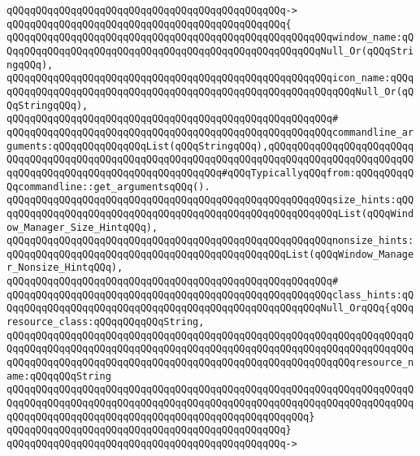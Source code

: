 \verb|qQQqqQQqqQQqqQQqqQQqqQQqqQQqqQQqqQQqqQQqqQQqqQQq->|\newline
\verb|qQQqqQQqqQQqqQQqqQQqqQQqqQQqqQQqqQQqqQQqqQQqqQQq{|\newline
\verb|qQQqqQQqqQQqqQQqqQQqqQQqqQQqqQQqqQQqqQQqqQQqqQQqqQQqqQQqwindow_name:qQQqqQQqqQQqqQQqqQQqqQQqqQQqqQQqqQQqqQQqqQQqqQQqqQQqqQQqNull_Or(qQQqStringqQQq),|\newline
\verb|qQQqqQQqqQQqqQQqqQQqqQQqqQQqqQQqqQQqqQQqqQQqqQQqqQQqqQQqicon_name:qQQqqQQqqQQqqQQqqQQqqQQqqQQqqQQqqQQqqQQqqQQqqQQqqQQqqQQqqQQqqQQqNull_Or(qQQqStringqQQq),|\newline
\verb|qQQqqQQqqQQqqQQqqQQqqQQqqQQqqQQqqQQqqQQqqQQqqQQqqQQqqQQq#|\newline
\verb|qQQqqQQqqQQqqQQqqQQqqQQqqQQqqQQqqQQqqQQqqQQqqQQqqQQqqQQqcommandline_arguments:qQQqqQQqqQQqqQQqList(qQQqStringqQQq),qQQqqQQqqQQqqQQqqQQqqQQqqQQqqQQqqQQqqQQqqQQqqQQqqQQqqQQqqQQqqQQqqQQqqQQqqQQqqQQqqQQqqQQqqQQqqQQqqQQqqQQqqQQqqQQqqQQqqQQqqQQqqQQqqQQq#qQQqTypicallyqQQqfrom:qQQqqQQqqQQqcommandline::get_argumentsqQQq().|\newline
\verb|qQQqqQQqqQQqqQQqqQQqqQQqqQQqqQQqqQQqqQQqqQQqqQQqqQQqqQQqsize_hints:qQQqqQQqqQQqqQQqqQQqqQQqqQQqqQQqqQQqqQQqqQQqqQQqqQQqqQQqqQQqList(qQQqWindow_Manager_Size_HintqQQq),|\newline
\verb|qQQqqQQqqQQqqQQqqQQqqQQqqQQqqQQqqQQqqQQqqQQqqQQqqQQqqQQqnonsize_hints:qQQqqQQqqQQqqQQqqQQqqQQqqQQqqQQqqQQqqQQqqQQqqQQqList(qQQqWindow_Manager_Nonsize_HintqQQq),|\newline
\verb|qQQqqQQqqQQqqQQqqQQqqQQqqQQqqQQqqQQqqQQqqQQqqQQqqQQqqQQq#|\newline
\verb|qQQqqQQqqQQqqQQqqQQqqQQqqQQqqQQqqQQqqQQqqQQqqQQqqQQqqQQqclass_hints:qQQqqQQqqQQqqQQqqQQqqQQqqQQqqQQqqQQqqQQqqQQqqQQqqQQqqQQqNull_OrqQQq{qQQqresource_class:qQQqqQQqqQQqString,|\newline
\verb|qQQqqQQqqQQqqQQqqQQqqQQqqQQqqQQqqQQqqQQqqQQqqQQqqQQqqQQqqQQqqQQqqQQqqQQqqQQqqQQqqQQqqQQqqQQqqQQqqQQqqQQqqQQqqQQqqQQqqQQqqQQqqQQqqQQqqQQqqQQqqQQqqQQqqQQqqQQqqQQqqQQqqQQqqQQqqQQqqQQqqQQqqQQqqQQqqQQqqQQqresource_name:qQQqqQQqString|\newline
\verb|qQQqqQQqqQQqqQQqqQQqqQQqqQQqqQQqqQQqqQQqqQQqqQQqqQQqqQQqqQQqqQQqqQQqqQQqqQQqqQQqqQQqqQQqqQQqqQQqqQQqqQQqqQQqqQQqqQQqqQQqqQQqqQQqqQQqqQQqqQQqqQQqqQQqqQQqqQQqqQQqqQQqqQQqqQQqqQQqqQQqqQQqqQQqqQQq}|\newline
\verb|qQQqqQQqqQQqqQQqqQQqqQQqqQQqqQQqqQQqqQQqqQQqqQQq}|\newline
\verb|qQQqqQQqqQQqqQQqqQQqqQQqqQQqqQQqqQQqqQQqqQQqqQQq->|\newline
